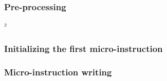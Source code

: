 \subsubsection{Pre-processing}                                                       \label{mmu: instructions: modexpdata: preprocessing}                    ²
\subsubsection{Initializing the first micro-instruction}                             \label{mmu: instructions: modexpdata: initializing}                     
\subsubsection{Micro-instruction writing}                                            \label{mmu: instructions: modexpdata: micro instruction writing}        

